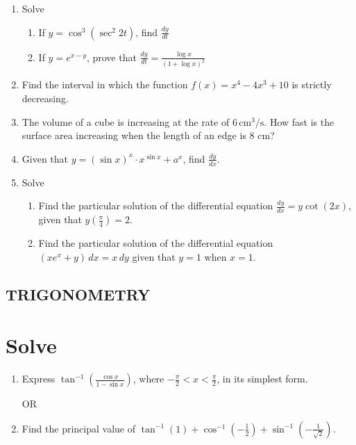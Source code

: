 \documentclass{article}
\begin{document}
\begin{enumerate}[label=\textbf{\arabic*.}]
    \item Solve

    \begin{enumerate}[label=\alph*)] %
        \item If \( y = \cos^3(\sec^2 2t) \), find \( \frac{dy}{dt} \)
        \item If \( y = e^{x - y} \), prove that \( \frac{dy}{dt} = \frac{\log x}{(1 + \log x)^2} \)
    \end{enumerate}

    \item Find the interval in which the function \( f(x) = x^4 - 4x^3 + 10 \) is strictly decreasing.

    \item The volume of a cube is increasing at the rate of \( 6 \, \text{cm}^3/\text{s} \). How fast is the surface area increasing when the length of an edge is 8 cm?

    \item Given that \( y = (\sin x)^x \cdot x^{\sin x} + a^x \), find \( \frac{dy}{dx} \).

    \item Solve

    \begin{enumerate}[label=\alph*)] %
        \item Find the particular solution of the differential equation \( \frac{dy}{dx} = y \cot(2x) \), given that \( y\left(\frac{\pi}{4}\right) = 2 \).
        \item Find the particular solution of the differential equation \( (x e^x + y) \, dx = x \, dy \) given that \( y = 1 \) when \( x = 1 \).
    \end{enumerate}

\end{enumerate}

\subsection*{TRIGONOMETRY}


\section*{Solve}

\begin{enumerate}[label=\alph*)] %
    \item Express \(\tan^{-1}\left(\frac{\cos x}{1 - \sin x}\right)\), where \(-\frac{\pi}{2} < x < \frac{\pi}{2}\), in its simplest form.

    \begin{center}
        OR
        \end{center}
    
    \item Find the principal value of \(\tan^{-1}(1) + \cos^{-1}\left(-\frac{1}{2}\right) + \sin^{-1}\left(-\frac{1}{\sqrt{2}}\right)\).
\end{enumerate}
\end{document}
